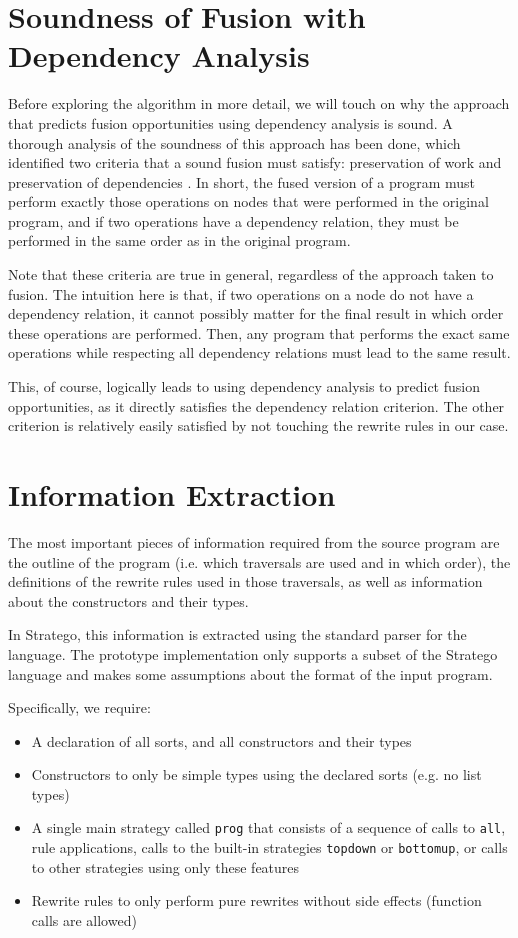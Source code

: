 \section{Soundness of Fusion with Dependency Analysis}
Before exploring the algorithm in more detail, we will touch on why the approach that predicts fusion opportunities using dependency analysis is sound. A thorough analysis of the soundness of this approach has been done, which identified two criteria that a sound fusion must satisfy: preservation of work and preservation of dependencies \cite{SakkaS017, SakkaSN019}. In short, the fused version of a program must perform exactly those operations on nodes that were performed in the original program, and if two operations have a dependency relation, they must be performed in the same order as in the original program.

Note that these criteria are true in general, regardless of the approach taken to fusion. The intuition here is that, if two operations on a node do not have a dependency relation, it cannot possibly matter for the final result in which order these operations are performed. Then, any program that performs the exact same operations while respecting all dependency relations must lead to the same result.

This, of course, logically leads to using dependency analysis to predict fusion opportunities, as it directly satisfies the dependency relation criterion. The other criterion is relatively easily satisfied by not touching the rewrite rules in our case.

\section{Information Extraction}
The most important pieces of information required from the source program are the outline of the program (i.e. which traversals are used and in which order), the definitions of the rewrite rules used in those traversals, as well as information about the constructors and their types.

In Stratego, this information is extracted using the standard parser for the language. The prototype implementation only supports a subset of the Stratego language and makes some assumptions about the format of the input program.

Specifically, we require:
\begin{itemize}
    \item A declaration of all sorts, and all constructors and their types
    \item Constructors to only be simple types using the declared sorts (e.g. no list types)
    \item A single main strategy called \texttt{prog} that consists of a sequence of calls to \texttt{all}, rule applications, calls to the built-in strategies \texttt{topdown} or \texttt{bottomup}, or calls to other strategies using only these features
    \item Rewrite rules to only perform pure rewrites without side effects (function calls are allowed)
\end{itemize}

